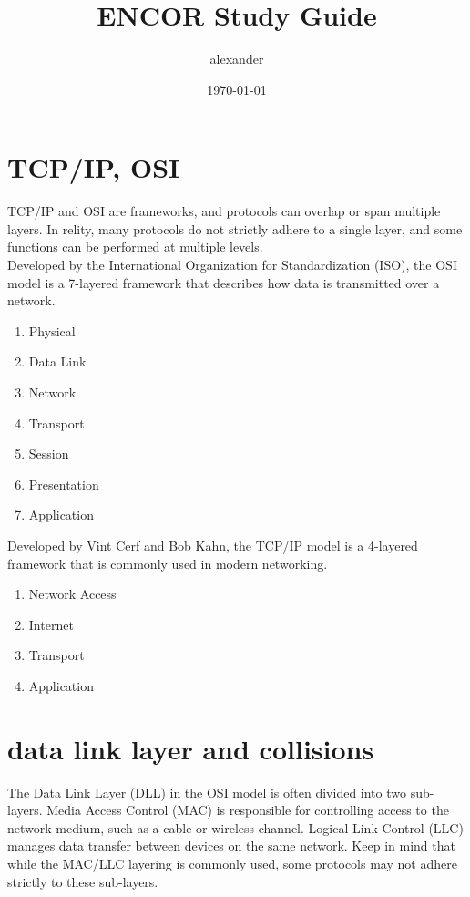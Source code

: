 \documentclass[parindent=0pt]{article}
\title{ENCOR Study Guide}
\author{alexander}
\date{\today}
\begin{document}
\maketitle

\section*{TCP/IP, OSI}

TCP/IP and OSI are frameworks, and protocols can overlap or span multiple layers. In relity, many protocols do not strictly adhere to a single layer, and some functions can be performed at multiple levels.\\

Developed by the International Organization for Standardization (ISO), the OSI model is a 
7-layered framework that describes how data is transmitted over a network.	
	\begin{enumerate}
		\item Physical
		\item Data Link
		\item Network
		\item Transport
		\item Session
		\item Presentation
		\item Application
	\end{enumerate}

Developed by Vint Cerf and Bob Kahn, the TCP/IP model is a 4-layered framework that is commonly 
used in modern networking.
	\begin{enumerate}
		\item Network Access
		\item Internet
		\item Transport
		\item Application
	\end{enumerate}


\section*{data link layer and collisions}
The Data Link Layer (DLL) in the OSI model is often divided into two sub-layers. Media Access Control (MAC) is responsible for controlling access to the network medium, such as a cable or wireless channel. Logical Link Control (LLC) manages data transfer between devices on the same network. Keep in mind that while the MAC/LLC layering is commonly used, some protocols may not adhere strictly to these sub-layers.\\
\end{document}
